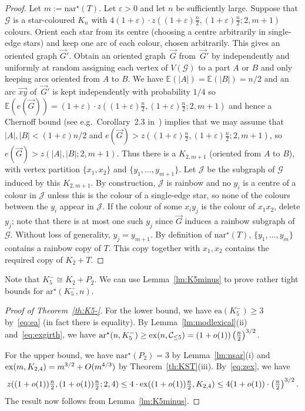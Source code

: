 \documentclass[a4paper, 12pt]{article}
\numberwithin{equation}{section}
\def\eps{{\varepsilon}}
\def\sar{{\mathrm{ar}^{\star}}}
\def\ea{{\mathrm{ea}}}
\def\nsar{{\mathrm{n}\sar}}
\newcommand{\ova}[1]{\overrightarrow{#1}}
\newcommand{\mc}[1]{\mathcal{#1}}
\newcommand{\ms}[1]{\mathscr{#1}}
\begin{document}
\begin{proof}
    Let $m := \nsar(T)$. 
    Let $\eps>0$ and let $n$ be sufficiently large.
    Suppose that $\ms{G}$ is a star-coloured $K_n$ with $4(1+\eps)\cdot z((1+\eps)\tfrac{n}{2},(1+\eps)\tfrac{n}{2};2,m+1)$ colours.
    Orient each star from its centre (choosing a centre arbitrarily in single-edge stars) and keep one arc of each colour, chosen arbitrarily. This gives an oriented graph $\ova G'$.
    Obtain an oriented graph~$\ova{G}$ from~$\ova{G}'$ by independently 
    and uniformly at random assigning each vertex of $V(\ms{G})$ to a part $A$ or $B$ and only keeping arcs oriented from $A$ to $B$.
    We have $\mathbb{E}(|A|)=\mathbb{E}(|B|) = n/2$ and an arc $\overrightarrow{xy}$ of~$\ova{G}'$ is kept independently with probability $1/4$ so $\mathbb{E}(e(\ova{G})) = (1+\eps) \cdot z((1+\eps)\tfrac{n}{2},(1+\eps)\tfrac{n}{2};2,m+1)$ and hence a Chernoff bound (see e.g.~Corollary~2.3 in~\cite{janson2011random}) implies that we may assume that $|A|,|B| < (1+\eps)n/2$ and $e(\ova{G}) > z((1+\eps)\tfrac{n}{2},(1+\eps)\tfrac{n}{2};2,m+1)$, so $e(\ova{G}) > z(|A|,|B|;2,m+1)$.
    Thus there is a $K_{2,m+1}$ (oriented from $A$ to $B$), with vertex partition $\{x_1,x_2\}$ and $\{y_1,\ldots,y_{m+1}\}$.
    Let $\ms{J}$ be the subgraph of $\ms{G}$ induced by this $K_{2,m+1}$.
    By construction, $\ms{J}$ is rainbow and no $y_i$ is a centre of a colour in $\ms{J}$ unless this is the colour of a single-edge star, so none of the colours between the $y_i$ appear in $\ms{J}$.
    If the colour of some $x_iy_j$ is the colour of $x_1x_2$, delete $y_j$; note that there is at most one such $y_j$ since $\ova{G}$ induces a rainbow subgraph of $\ms{G}$. Without loss of generality, $y_j=y_{m+1}$.
    By definition of $\nsar(T)$, $\{y_1,\ldots,y_{m}\}$ contains a rainbow copy of $T$. This copy together with $x_1,x_2$ contains the required copy of $K_2+T$.
\end{proof}

Note that $K_5^- \cong K_2 + P_2$.
We can use Lemma~\ref{lm:K5minus} to prove rather tight bounds for $\sar(K_5^-,n)$.

\begin{proof}[Proof of Theorem~\ref{th:K5-}]
    For the lower bound,
    we have $\ea(K_5^-) \geq 3$ by~\eqref{eq:ea} (in fact there is equality).
    By Lemma~\ref{lm:modlexical}(ii) and~\eqref{eq:exgirth}, we have $\sar(n,K_5^-) \geq {\rm ex}(n,\mc{C}_{\leq 5}) = (1+o(1))\left(\frac{n}{2}\right)^{3/2}$.

    For the upper bound, we have $\nsar(P_2)=3$ by Lemma~\ref{lm:nsar}(i) and ${\rm ex}(m,K_{2,4}) = m^{3/2}+O(m^{4/3})$ by Theorem~\ref{th:KST}(iii).
    By~\eqref{eq:zex}, we have
    $$
    z((1+o(1))\tfrac{n}{2},(1+o(1))\tfrac{n}{2};2,4) \leq 4\cdot{\rm ex}((1+o(1))\tfrac{n}{2},K_{2,4}) \leq 4(1+o(1))\cdot \left(\tfrac{n}{2}\right)^{3/2}.
    $$
    The result now follows from Lemma~\ref{lm:K5minus}.
    \end{proof}
\end{document}
